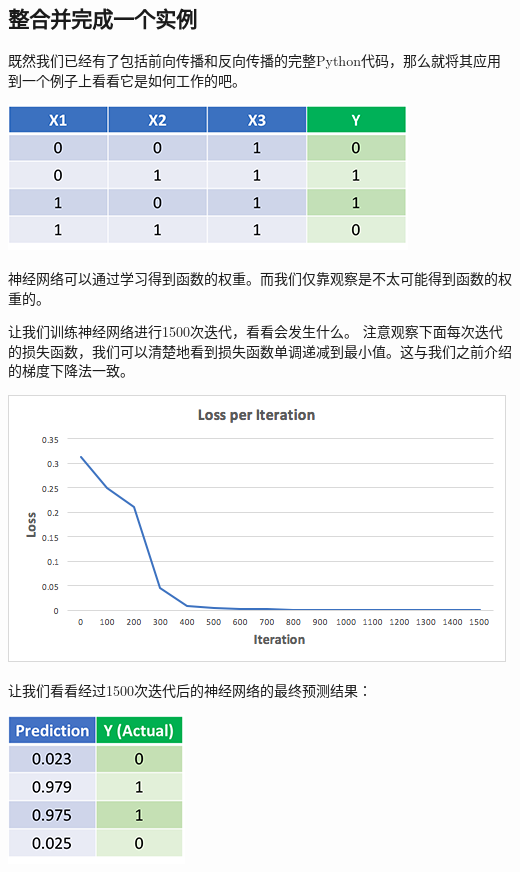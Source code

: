 \subsection{整合并完成一个实例}

既然我们已经有了包括前向传播和反向传播的完整Python代码，那么就将其应用到一个例子上看看它是如何工作的吧。

\noindent\includegraphics[width=\textwidth]{4.png}

神经网络可以通过学习得到函数的权重。而我们仅靠观察是不太可能得到函数的权重的。

让我们训练神经网络进行1500次迭代，看看会发生什么。 注意观察下面每次迭代的损失函数，我们可以清楚地看到损失函数单调递减到最小值。这与我们之前介绍的梯度下降法一致。

\noindent\includegraphics[width=\textwidth]{5.png}

让我们看看经过1500次迭代后的神经网络的最终预测结果：

\noindent\includegraphics[width=\textwidth]{6.png}


